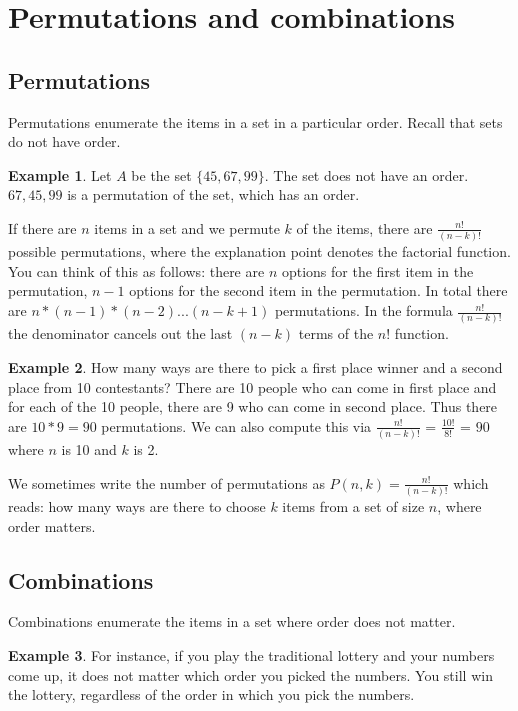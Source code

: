 \documentclass[]{article}
\theoremstyle{definition}
\newtheorem{exmp}{Example}[section]
\begin{document}
\section{Permutations and combinations}

\subsection{Permutations}

Permutations enumerate the items in a set in a particular order. Recall that sets do not have order.

\begin{exmp}
Let $A$ be the set $\{45, 67, 99\}$. The set does not have an order. $67, 45, 99$ is a permutation of the set, which has an order.
\end{exmp} 

If there are $n$ items in a set and we permute $k$ of the items, there are $\frac{n!}{(n-k)!}$ possible permutations, where the explanation point denotes the factorial function. You can think of this as follows: there are $n$ options for the first item in the permutation, $n-1$ options for the second item in the permutation. In total there are $n * (n-1) * (n-2) ... (n - k + 1)$ permutations. In the formula $\frac{n!}{(n-k)!}$ the denominator cancels out the last $(n-k)$ terms of the $n!$ function.

\begin{exmp}
How many ways are there to pick a first place winner and a second place from 10 contestants? There are 10 people who can come in first place and for each of the 10 people, there are 9 who can come in second place. Thus there are $10*9=90$ permutations. We can also compute this via $\frac{n!}{(n-k)!}$ = $\frac{10!}{8!}$ = $90$ where $n$ is 10 and $k$ is 2. 
\end{exmp} 

We sometimes write the number of permutations as $P(n,k) = \frac{n!}{(n-k)!}$ which reads: how many ways are there to choose $k$ items from a set of size $n$, where order matters.

\subsection{Combinations}\label{s:combinations}
Combinations enumerate the items in a set where order does not matter. 

\begin{exmp}
For instance, if you play the traditional lottery and your numbers come up, it does not matter which order you picked the numbers. You still win the lottery, regardless of the order in which you pick the numbers. 
\end{exmp} 
\end{document}
